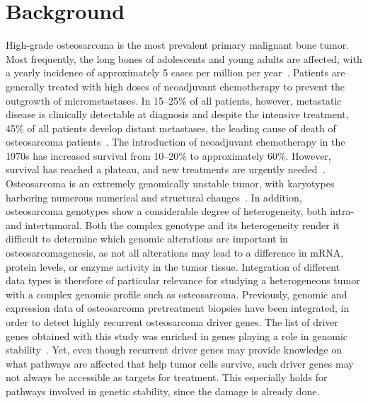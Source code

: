 \section{Background}\label{introduction6}
High\hyp{}grade osteosarcoma is the most prevalent primary malignant bone tumor. Most frequently, the long bones of adolescents and young adults are affected, with a yearly incidence of approximately 5 cases per million per year~\cite{raymond2002conventional}. Patients are generally treated with high doses of neoadjuvant chemotherapy to prevent the outgrowth of micrometastases. In 15--25\% of all patients, however, metastatic disease is clinically detectable at diagnosis and despite the intensive treatment, 45\% of all patients develop distant metastases, the leading cause of death of osteosarcoma patients~\cite{bacci2006prognostic,buddingh2010prognostic}. The introduction of neoadjuvant chemotherapy in the 1970s has increased survival from 10--20\% to approximately 60\%. However, survival has reached a plateau, and new treatments are urgently needed~\cite{allison2012meta,anninga2011chemotherapeutic,hattinger2010emerging}. Osteosarcoma is an extremely genomically unstable tumor, with karyotypes harboring numerous numerical and structural changes~\cite{cleton2005central,szuhai2012molecular}. In addition, osteosarcoma genotypes show a considerable degree of heterogeneity, both intra- and intertumoral. Both the complex genotype and its heterogeneity render it difficult to determine which genomic alterations are important in osteosarcomagenesis, as not all alterations may lead to a difference in mRNA, protein levels, or enzyme activity in the tumor tissue. Integration of different data types is therefore of particular relevance for studying a heterogeneous tumor with a complex genomic profile such as osteosarcoma. Previously, genomic and expression data of osteosarcoma pretreatment biopsies have been integrated, in order to detect highly recurrent osteosarcoma driver genes. The list of driver genes obtained with this study was enriched in genes playing a role in genomic stability~\cite{kuijjer2012identification}. Yet, even though recurrent driver genes may provide knowledge on what pathways are affected that help tumor cells survive, such driver genes may not always be accessible as targets for treatment. This especially holds for pathways involved in genetic stability, since the damage is already done.

